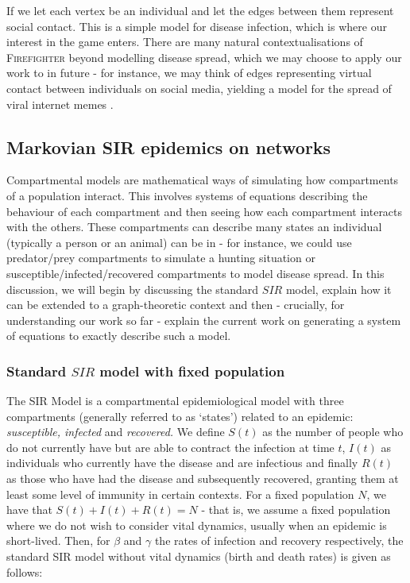 \documentclass[../report.tex]{subfiles}
\begin{document}
If we let each vertex be an individual and let the edges between them represent social contact. This is a simple model for disease infection, which is where our interest in the game enters. There are many natural contextualisations of {\scshape Firefighter} beyond modelling disease spread, which we may choose to apply our work to in future - for instance, we may think of edges representing virtual contact between individuals on social media, yielding a model for the spread of viral internet memes \cite{obrien_2019}.


\subsection{Markovian SIR epidemics on networks}
\label{subsec:SIR-lit}

Compartmental models are mathematical ways of simulating how compartments of a population interact. This involves systems of equations describing the behaviour of each compartment and then seeing how each compartment interacts with the others. These compartments can describe many states an individual (typically a person or an animal) can be in - for instance, we could use predator/prey compartments to simulate a hunting situation or susceptible/infected/recovered compartments to model disease spread. In this discussion, we will begin by discussing the standard $SIR$ model, explain how it can be extended to a graph-theoretic context and then - crucially, for understanding our work so far - explain the current work on generating a system of equations to exactly describe such a model.

\subsubsection{Standard $SIR$ model with fixed population}

The SIR Model is a compartmental epidemiological model with three compartments (generally referred to as `states') related to an epidemic: {\it susceptible, infected} and {\it recovered.} We define $S(t)$ as the number of people who do not currently have but are able to contract the infection at time $t$, $I(t)$ as individuals who currently have the disease and are infectious and finally $R(t)$ as those who have had the disease and subsequently recovered, granting them at least some level of immunity in certain contexts. For a fixed population $N$, we have that $S(t) + I(t) + R(t) = N$ - that is, we assume a fixed population where we do not wish to consider vital dynamics, usually when an epidemic is short-lived. Then, for $\beta$ and $\gamma$ the rates of infection and recovery respectively, the standard SIR model without vital dynamics (birth and death rates) is given as follows:
\end{document}
